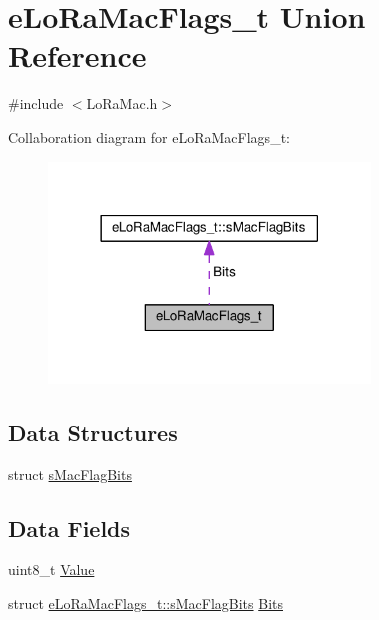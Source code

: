 \hypertarget{unioneLoRaMacFlags__t}{}\section{e\+Lo\+Ra\+Mac\+Flags\+\_\+t Union Reference}
\label{unioneLoRaMacFlags__t}


{\ttfamily \#include $<$Lo\+Ra\+Mac.\+h$>$}



Collaboration diagram for e\+Lo\+Ra\+Mac\+Flags\+\_\+t\+:
\nopagebreak
\begin{figure}[H]
\begin{center}
\leavevmode
\includegraphics[width=242pt]{unioneLoRaMacFlags__t__coll__graph}
\end{center}
\end{figure}
\subsection*{Data Structures}
\begin{DoxyCompactItemize}
\item 
struct \hyperlink{structeLoRaMacFlags__t_1_1sMacFlagBits}{s\+Mac\+Flag\+Bits}
\end{DoxyCompactItemize}
\subsection*{Data Fields}
\begin{DoxyCompactItemize}
\item 
uint8\+\_\+t \hyperlink{unioneLoRaMacFlags__t_a11a65b748bc5c36714d830d5daa93fe3}{Value}
\item 
struct \hyperlink{structeLoRaMacFlags__t_1_1sMacFlagBits}{e\+Lo\+Ra\+Mac\+Flags\+\_\+t\+::s\+Mac\+Flag\+Bits} \hyperlink{unioneLoRaMacFlags__t_a23c1c70ba3e3306aaaedd6f62c2aab15}{Bits}
\end{DoxyCompactItemize}


